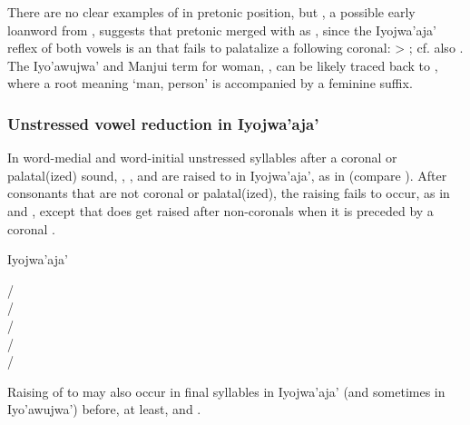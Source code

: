 There are no clear examples of  in pretonic position, but , a possible early loanword from , suggests that pretonic  merged with  as , since the Iyojwa’aja’ reflex of both vowels is an  that fails to palatalize a following coronal:  > ; cf. also . The Iyo’awujwa’ and Manjui term for woman, , can be likely traced back to , where a root meaning `man, person' is accompanied by a feminine suffix.

\subsubsection{Unstressed vowel reduction in Iyojwa'aja'}\label{ch-unstr-red}

In word-medial and word-initial unstressed syllables after a coronal or palatal(ized) sound, , , and  are raised to  in Iyojwa’aja’, as in  (compare ). After consonants that are not coronal or palatal(ized), the raising fails to occur, as in  and , except that  does get raised after non-coronals when it is preceded by a coronal . 

\ea
Iyojwa'aja'
    \begin{xlist}
        \ex {} / \\
        \ex {} / \\
        \ex {} / \\
        \ex {} / \\
        \ex {} / \label{ojwenni}
    \end{xlist}
\z
{}

Raising of  to  may also occur in final syllables in Iyojwa’aja’ (and sometimes in Iyo’awujwa’) before, at least,  and .

\begin{exe}
    \ex {}
    \ex {}
    \ex {}
\end{exe}


